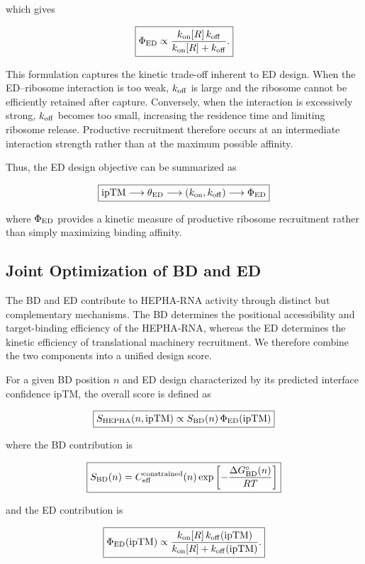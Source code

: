 \documentclass{article}
\begin{document}
which gives

\[
\boxed{
\Phi_{\rm ED}
\propto
\frac{
k_{\rm on}[R]\,k_{\rm off}
}{
k_{\rm on}[R]+k_{\rm off}
}.
}
\]

This formulation captures the kinetic trade-off inherent to ED design. When the ED--ribosome interaction is too weak, \(k_{\rm off}\) is large and the ribosome cannot be efficiently retained after capture. Conversely, when the interaction is excessively strong, \(k_{\rm off}\) becomes too small, increasing the residence time and limiting ribosome release. Productive recruitment therefore occurs at an intermediate interaction strength rather than at the maximum possible affinity.

Thus, the ED design objective can be summarized as

\[
\boxed{
\mathrm{ipTM}
\longrightarrow
\theta_{\rm ED}
\longrightarrow
(k_{\rm on},k_{\rm off})
\longrightarrow
\Phi_{\rm ED}
}
\]

where \(\Phi_{\rm ED}\) provides a kinetic measure of productive ribosome recruitment rather than simply maximizing binding affinity.


\subsection{Joint Optimization of BD and ED}

The BD and ED contribute to HEPHA-RNA activity through distinct but complementary mechanisms. The BD determines the positional accessibility and target-binding efficiency of the HEPHA-RNA, whereas the ED determines the kinetic efficiency of translational machinery recruitment. We therefore combine the two components into a unified design score.

For a given BD position \(n\) and ED design characterized by its predicted interface confidence \(\mathrm{ipTM}\), the overall score is defined as

\[
\boxed{
S_{\rm HEPHA}(n,\mathrm{ipTM})
\propto
S_{\rm BD}(n)\,
\Phi_{\rm ED}(\mathrm{ipTM})
}
\]

where the BD contribution is

\[
\boxed{
S_{\rm BD}(n)
=
C_{\rm eff}^{\rm constrained}(n)
\exp\left[
-\frac{\Delta G_{\rm BD}^{\circ}(n)}
{RT}
\right]
}
\]

and the ED contribution is

\[
\boxed{
\Phi_{\rm ED}(\mathrm{ipTM})
\propto
\frac{
k_{\rm on}[R]\,k_{\rm off}(\mathrm{ipTM})
}{
k_{\rm on}[R]+k_{\rm off}(\mathrm{ipTM})
}.
}
\]
\end{document}
